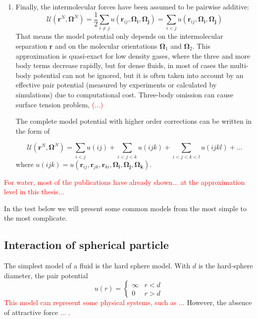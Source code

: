 \begin{enumerate}
\item Finally, the intermolecular forces have been assumed to be pairwise
additive:
\begin{equation}
\mathcal{U}(\mathbf{r}^{N},\mathbf{\Omega}^{N})=\frac{1}{2}\sum_{i\neq j}u(\mathbf{r}_{ij},\mathbf{\Omega_{i}},\mathbf{\Omega_{j}})=\sum_{i<j}u(\mathbf{r}_{ij},\mathbf{\Omega_{i}},\mathbf{\Omega_{j}})\label{eq:pair-potential}
\end{equation}
That means the model potential only depends on the intermolecular
separation $\mathbf{r}$ and on the molecular orientations $\mathbf{\Omega}_{1}$
and $\mathbf{\Omega}_{2}$. This approximation is quasi-exact for
low density gases, where the three and more body terms decrease rapidly,
but for dense fluids, in most of cases the multi-body potential can
not be ignored, but it is often taken into account by an effective
pair potential (measured by experiments or calculated by simulations)
due to computational cost. Three-body omission can cause surface tension
problem, \textcolor{red}{(...)}


The complete model potential with higher order corrections can be
written in the form of


\begin{equation}
\mathcal{U}(\mathbf{r}^{N},\mathbf{\Omega}^{N})=\sum_{i<j}u(ij)+\sum_{i<j<k}u(ijk)+\sum_{i<j<k<l}u(ijkl)+...
\end{equation}
where $u(ijk)=u(\mathbf{r}_{ij},\mathbf{r}_{jk},\mathbf{r}_{ki},\mathbf{\Omega_{i}},\mathbf{\Omega_{j}},\mathbf{\Omega_{k}})$.

\end{enumerate}
\textcolor{red}{For water, most of the publications have already shown...
at the approximation level in this thesis...}

In the test below we will present some common models from the most
simple to the most complicate.


\subsection{Interaction of spherical particle}

The simplest model of a fluid is the hard sphere model. With $d$
is the hard-sphere diameter, the pair potential
\begin{equation}
u(r)=\begin{cases}
\infty & r<d\\
0 & r>d
\end{cases}
\end{equation}
\textcolor{red}{This model can represent some physical systems, such
as ... }However, the absence of attractive force \textcolor{red}{...}
.

